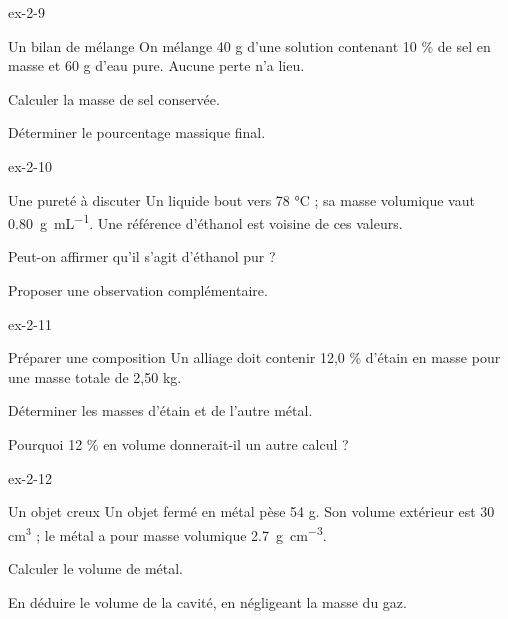 \begin{blocLivre}{ex-2-9}\begin{exercice}[3]{Un bilan de mélange}
On mélange 40 g d’une solution contenant 10 \% de sel en masse et 60 g d’eau pure. Aucune perte n’a lieu.
\begin{questions}
\item Calculer la masse de sel conservée.
\item Déterminer le pourcentage massique final.
\end{questions}
\end{exercice}\end{blocLivre}
\begin{blocLivre}{ex-2-10}\begin{exercice}[3]{Une pureté à discuter}
Un liquide bout vers 78 °C ; sa masse volumique vaut \qty{0,80}{g.mL^{-1}}. Une référence d’éthanol est voisine de ces valeurs.
\begin{questions}
\item Peut-on affirmer qu’il s’agit d’éthanol pur ?
\item Proposer une observation complémentaire.
\end{questions}
\end{exercice}\end{blocLivre}
\begin{blocLivre}{ex-2-11}\begin{exercice}[3]{Préparer une composition}
Un alliage doit contenir 12,0 \% d’étain en masse pour une masse totale de 2,50 kg.
\begin{questions}
\item Déterminer les masses d’étain et de l’autre métal.
\item Pourquoi 12 \% en volume donnerait-il un autre calcul ?
\end{questions}
\end{exercice}\end{blocLivre}
\begin{blocLivre}{ex-2-12}\begin{exercice}[3]{Un objet creux}
Un objet fermé en métal pèse 54 g. Son volume extérieur est 30 cm$^3$ ; le métal a pour masse volumique \qty{2,7}{g.cm^{-3}}.
\begin{questions}
\item Calculer le volume de métal.
\item En déduire le volume de la cavité, en négligeant la masse du gaz.
\end{questions}
\end{exercice}\end{blocLivre}


